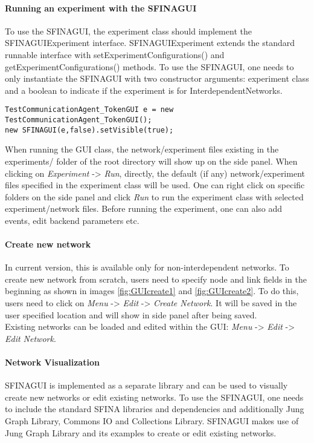 \documentclass[11pt,fleqn]{book} %
\begin{document}
\paragraph{Running an experiment with the SFINAGUI} To use the SFINAGUI, the experiment class should implement the SFINAGUIExperiment interface. SFINAGUIExperiment extends the standard runnable interface with setExperimentConfigurations() and getExperimentConfigurations() methods. To use the SFINAGUI, one needs to only instantiate the SFINAGUI with two constructor arguments: experiment class and a boolean to indicate if the experiment is for InterdependentNetworks.
\begin{lstlisting}[frame=single] 
TestCommunicationAgent_TokenGUI e = new TestCommunicationAgent_TokenGUI();
new SFINAGUI(e,false).setVisible(true);
\end{lstlisting}
When running the GUI class, the network/experiment files existing in the experiments/ folder of the root directory will show up on the side panel. When clicking on \textit{Experiment} -> \textit{Run}, directly, the default (if any) network/experiment files specified in the experiment class will be used. One can right click on specific folders on the side panel and click \textit{Run} to run the experiment class with selected experiment/network files. Before running the experiment, one can also add events, edit backend parameters etc.

\paragraph{Create new network} In current version, this is available only for non-interdependent networks. To create new network from scratch, users need to specify node and link fields in the beginning as shown in images \ref{fig:GUIcreate1} and \ref{fig:GUIcreate2}. To do this, users need to click on \textit{Menu} -> \textit{Edit} -> \textit{Create Network}. It will be saved in the user specified location and will show in side panel after being saved. \\
Existing networks can be loaded and edited within the GUI: \textit{Menu} -> \textit{Edit} -> \textit{Edit Network}.

\paragraph{Network Visualization} SFINAGUI is implemented as a separate library and can be used to visually create new networks or edit existing networks. To use the SFINAGUI, one needs to include the standard SFINA libraries and dependencies and additionally Jung Graph Library, Commons IO and Collections Library. SFINAGUI makes use of Jung Graph Library and its examples to create or edit existing networks.
\end{document}
